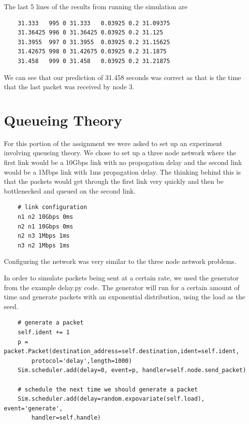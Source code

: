 \documentclass[11pt]{article}
\begin{document}
The last 5 lines of the results from running the simulation are

\vspace{5mm}

\begin{lstlisting}
    31.333   995 0 31.333   0.03925 0.2 31.09375
    31.36425 996 0 31.36425 0.03925 0.2 31.125
    31.3955  997 0 31.3955  0.03925 0.2 31.15625
    31.42675 998 0 31.42675 0.03925 0.2 31.1875
    31.458   999 0 31.458   0.03925 0.2 31.21875
\end{lstlisting}

\vspace{5mm}

We can see that our prediction of 31.458 seconds was correct as that is the time that the last packet was received by node 3.

\section{Queueing Theory}

For this portion of the assignment we were asked to set up an experiment involving queueing theory. We chose to set up a three node network where the first link would be a 10Gbps link with no propogation delay and the second link would be a 1Mbps link with 1ms propagation delay. The thinking behind this is that the packets would get through the first link very quickly and then be bottlenecked and queued on the second link.

\vspace{5mm}

\begin{lstlisting}
    # link configuration
    n1 n2 10Gbps 0ms
    n2 n1 10Gbps 0ms
    n2 n3 1Mbps 1ms
    n3 n2 1Mbps 1ms
\end{lstlisting}

\vspace{5mm}

Configuring the network was very similar to the three node network problems.

In order to simulate packets being sent at a certain rate, we used the generator from the example delay.py code. The generator will run for a certain amount of time and generate packets with an exponential distribution, using the load as the seed.

\vspace{5mm}

\begin{lstlisting}
    # generate a packet
    self.ident += 1
    p = packet.Packet(destination_address=self.destination,ident=self.ident,
        protocol='delay',length=1000)
    Sim.scheduler.add(delay=0, event=p, handler=self.node.send_packet)

    # schedule the next time we should generate a packet
    Sim.scheduler.add(delay=random.expovariate(self.load), event='generate', 
        handler=self.handle)
\end{lstlisting}
\end{document}
